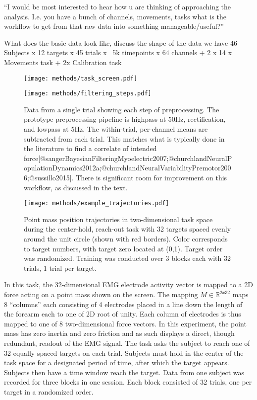 \documentclass[../main.tex]{subfiles}
\begin{document}
``I would be most interested to hear how u are thinking of approaching the analysis. I.e. you have a bunch of channels, movements, tasks what is the workflow to get from that raw data into something manageable/useful?''

What does the basic data look like, discuss the shape of the data we have
46 Subjects x 12 targets x 45 trials x ~5k timepoints x 64 channels + 2 x 14 x Movements task + 2x Calibration task

\begin{figure}
  \centering
    \texttt{[image: methods/task\_screen.pdf]}
    \caption[Center-hold, Reach-out task visual feedback]{}\label{fig:task_task_screen}
  \end{figure}

\begin{figure}
  \centering
  \texttt{[image: methods/filtering\_steps.pdf]}
  \caption[Data filtering steps]{Data from a single trial showing each step of preprocessing. The prototype preprocessing pipeline is highpass at 50Hz, rectification, and lowpass at 5Hz. The within-trial, per-channel means are subtracted from each trial. This matches what is typically done in the literature to find a correlate of intended force[@sangerBayesianFilteringMyoelectric2007;@churchlandNeuralPopulationDynamics2012a;@churchlandNeuralVariabilityPremotor2006;@sussillo2015]. There is significant room for improvement on this workflow, as discussed in the text.}\label{fig:filtering}
\end{figure}

\begin{figure}
  \centering
  \texttt{[image: methods/example\_trajectories.pdf]}
  \caption{Point mass position trajectories in two-dimensional task space during the center-hold, reach-out task with 32 targets spaced evenly around the unit circle (shown with red borders). Color corresponds to target numbers, with target zero located at (0,1). Target order was randomized. Training was conducted over 3 blocks each with 32 trials, 1 trial per target.}\label{fig:example_trajectories}
\end{figure}

In this task, the 32-dimensional EMG electrode activity vector is mapped to a 2D force acting on a point mass shown on the screen. The mapping $M\in\mathbb{R}^{2 x 32}$ maps 8 ``columns'' each consisting of 4 electrodes placed in a line down the length of the forearm each to one of 2D root of unity. Each column of electrodes is thus mapped to one of 8 two-dimensional force vectors. In this experiment, the point mass has zero inertia and zero friction and as such displays a direct, though redundant, readout of the EMG signal. The task asks the subject to reach one of 32 equally spaced targets on each trial. Subjects must hold in the center of the task space for a designated period of time, after which the target appears. Subjects then have a time window reach the target. Data from one subject was recorded for three blocks in one session. Each block consisted of 32 trials, one per target in a randomized order.
\end{document}
